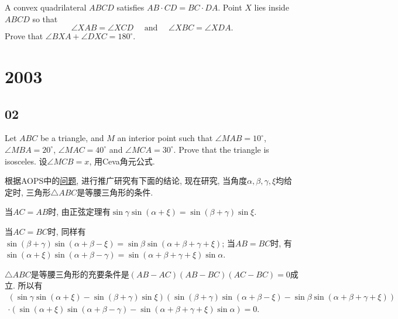 \bq{}{}
A convex quadrilateral $ABCD$ satisfies $AB\cdot CD = BC\cdot DA$. Point $X$ lies inside $ABCD$ so that 
\[
  \angle{XAB} = \angle{XCD}\quad\,\,\text{and}\quad\,\,\angle{XBC} = \angle{XDA}.
\]
Prove that $\angle{BXA} + \angle{DXC} = 180^\circ$.
\eq

\section{2003}
\subsection{02}

Let $ABC$ be a triangle, and $M$ an interior point such that $\angle MAB=10^\circ$, $\angle MBA=20^\circ$, $\angle MAC=40^\circ$ and $\angle MCA=30^\circ$. Prove that the triangle is isosceles.
\eq
\ba
设$\angle MCB=x$, 用Ceva角元公式.

根据AOPS中的\protect\href{https://artofproblemsolving.com/community/q1h2p2}{问题},
进行推广研究有下面的结论, 现在研究, 当角度$\alpha,\beta,\gamma,\xi$均给定时, 三角形$\triangle ABC$是等腰三角形的条件.
\begin{center}
\end{center}

当$AC=AB$时, 由正弦定理有$\sin\gamma\sin(\alpha+\xi)=\sin(\beta+\gamma)\sin\xi$.

当$AC=BC$时, 同样有$\sin(\beta+\gamma)\sin(\alpha+\beta-\xi)=\sin\beta\sin(\alpha+\beta+\gamma+\xi)$;
当$AB=BC$时, 有$\sin(\alpha+\xi)\sin(\alpha+\beta-\gamma)=\sin(\alpha+\beta+\gamma+\xi)\sin\alpha$.

$\triangle ABC$是等腰三角形的充要条件是$(AB-AC)(AB-BC)(AC-BC)=0$成立. 所以有
\[
\begin{array}{c}
\left(\sin\gamma\sin(\alpha+\xi)-\sin(\beta+\gamma)\sin\xi\right)\left(\sin(\beta+\gamma)\sin(\alpha+\beta-\xi)-\sin\beta\sin(\alpha+\beta+\gamma+\xi)\right)\\
\cdot\left(\sin(\alpha+\xi)\sin(\alpha+\beta-\gamma)-\sin(\alpha+\beta+\gamma+\xi)\sin\alpha\right)=0.
\end{array}
\]
\ea

